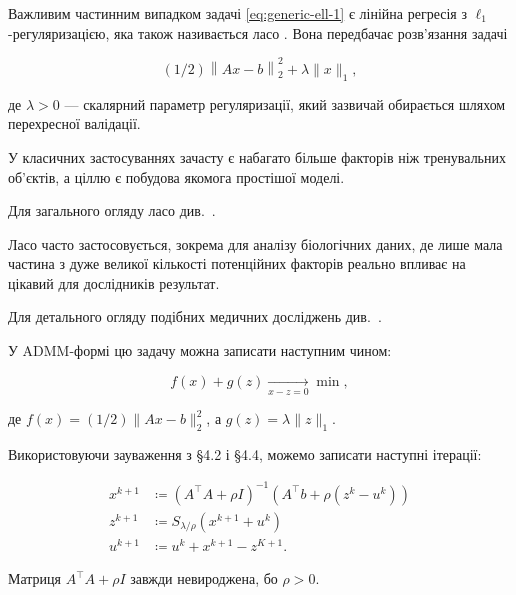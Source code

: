 Важливим частинним випадком задачі \eqref{eq:generic-ell-1} є лінійна регресія з $\ell_1$-регуляризацією, яка також називається ласо \cite{156}. Вона передбачає розв'язання задачі

\begin{equation}
    (1/2) \left\| A x - b \right\|_2^2 + \lambda \|x\|_1,
\end{equation}

де $\lambda > 0$ --- скалярний параметр регуляризації, який зазвичай обирається шляхом перехресної валідації. \medskip

У класичних застосуваннях зачасту є набагато більше факторів ніж тренувальних об'єктів, а ціллю є побудова якомога простішої моделі.

\begin{remark}
    Для загального огляду ласо див.~\cite[\S3.4.2]{95}.
\end{remark}

Ласо часто застосовується, зокрема для аналізу біологічних даних, де лише мала частина з дуже великої кількості потенційних факторів реально впливає на цікавий для дослідників результат.

\begin{remark}
    Для детального огляду подібних медичних досліджень див.~\cite[\S18.4]{95}.
\end{remark}

У ADMM-формі цю задачу можна записати наступним чином:

\begin{equation}
    f(x) + g(z) \xrightarrow[x - z = 0]{} \min,
\end{equation}

де $f(x) = (1 / 2) \|A x - b\|_2^2$, а $g(z) = \lambda \|z\|_1$. \medskip

Використовуючи зауваження з \S4.2 і \S4.4, можемо записати наступні ітерації:

\begin{align}
    x^{k + 1} &\coloneqq \left( A^\intercal A + \rho I \right)^{-1} \left( A^\intercal b + \rho \left( z^k - u^k \right) \right) \\
    z^{k + 1} &\coloneqq S_{\lambda / \rho} \left( x^{k + 1} + u^k \right) \\
    u^{k + 1} &\coloneqq u^k + x^{k + 1} - z^{K + 1}.
\end{align}

\begin{remark}
    Матриця $A^\intercal A + \rho I$ завжди невироджена, бо $\rho > 0$.
\end{remark}

